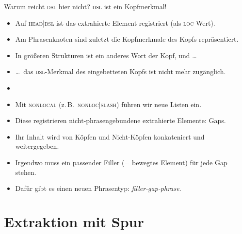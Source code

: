 \begin{frame}
  {Warum reicht \textsc{dsl} hier nicht?}
  \onslide<+->
  \onslide<+->
  \textsc{dsl} ist ein \alert{Kopfmerkmal}!\\
  \Zeile
  \begin{itemize}[<+->]
    \item Auf \textsc{head|dsl} ist das extrahierte Element registriert (als \textsc{loc}-Wert).
    \item Am Phrasenknoten sind zuletzt die Kopfmerkmale des Kopfs repräsentiert.
    \item In größeren Strukturen ist ein anderes Wort der Kopf, und \ldots
    \item \ldots\ das \textsc{dsl}-Merkmal des eingebetteten Kopfs ist nicht mehr zugänglich.
    \item {}
      \Halbzeile
    \item Mit \textsc{nonlocal} (z.\,B.\ \textsc{nonloc|slash}) führen wir neue Listen ein.
    \item Diese registrieren \alert{nicht-phrasengebundene extrahierte Elemente}: \alert{Gaps}.
    \item Ihr Inhalt wird von Köpfen und Nicht-Köpfen konkateniert und weitergegeben.
    \item Irgendwo muss ein passender \alert{Filler} (= bewegtes Element) für jede Gap stehen.
    \item Dafür gibt es einen neuen Phrasentyp: \alert{\textit{filler-gap-phrase}}.
  \end{itemize}
\end{frame}



\section{Extraktion mit Spur}

